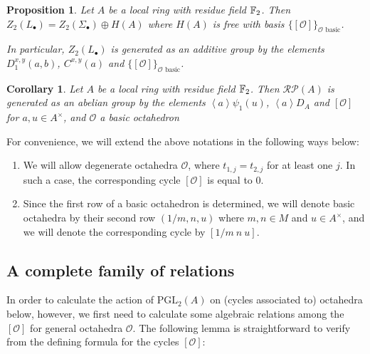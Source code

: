 \documentclass[12pt]{amsart}
\newtheorem{prop}[lem]{Proposition}
\newtheorem{cor}[lem]{Corollary}
\theoremstyle{definition}
\newcommand{\F}[1]{\Bbb{F}_{#1}}
\newcommand{\oct}{\mathcal{O}}%
\newcommand{\cyc}[1]{\left[ #1\right]} %
\newcommand{\scyc}[1]{\left[ #1 \right]} %
\newcommand{\pgl}[2]{\mathrm{PGL}_{#1}(#2)}
\newcommand{\rpb}[1]{\mathcal{RP}(#1)}%
\newcommand{\suss}[2]{\psi_{#1}\left( #2\right)}
\newcommand{\cconst}[1]{D_{#1}}
\newcommand{\<}{\langle}
\renewcommand{\>}{\rangle}
\newcommand{\an}[1]{\left\langle{#1}\right\rangle}
\begin{document}
\begin{prop}\label{prop:localf2} Let $A$ be a local ring with residue field $\F{2}$. Then $Z_2(L_\bullet)=Z_2(\Sigma_\bullet)\oplus H(A)$ where $H(A)$ is free with basis 
$\{ \cyc{\oct}\}_{\oct \mbox{ basic}}$. 

In particular, $Z_2(L_\bullet)$ is generated as an additive group by the elements $D_1^{x,y}(a,b)$, $C^{x,y}(a)$ and $\{ \cyc{\oct}\}_{\oct \mbox{ basic}}$.
\end{prop}

\begin{cor}\label{cor:localf2} Let $A$ be a local ring with residue field $\F{2}$. Then $\rpb{A}$ is generated as an abelian group by the elements
$\an{a}\suss{1}{u}$, $\an{a}\cconst{A}$ and $\cyc{\oct}$ for $a,u\in A^\times$, and $\oct$ a basic octahedron
\end{cor}

For convenience, we will extend the above notations in the following ways below:
\begin{enumerate}
\item  We will allow degenerate octahedra $\oct$, where $t_{1,j}=t_{2,j}$ for at least one $j$. In such a case, the corresponding cycle $\cyc{\oct}$ is equal to $0$.
\item Since the first row of a basic octahedron is determined, we will denote basic octahedra by their second row $(1/m, n,u)$ where $m,n\in M$ and $u\in A^\times$, and we will denote the corresponding cycle by $\scyc{1/m\ n\ u}$.
\end{enumerate}

\subsection{A complete family of relations}


In order to calculate the action of $\pgl{2}{A}$ on (cycles associated to) octahedra below, however, we first need to calculate some algebraic relations among the $\cyc{\oct}$ for general 
octahedra $\oct$.  The following lemma is straightforward to verify from the defining formula for the cycles $\cyc{\oct}$:
\end{document}
